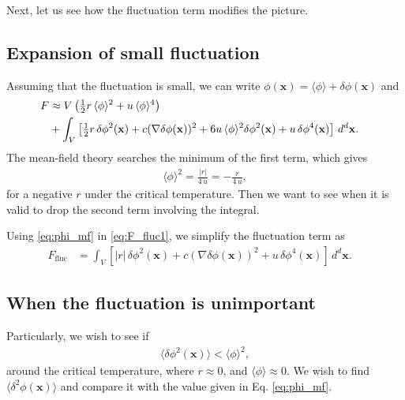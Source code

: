\documentclass{article}
\begin{document}
Next, let us see how the fluctuation term modifies the picture.



\subsection{Expansion of small fluctuation}



Assuming that the fluctuation is small, we can write
$\phi(\mathbf x) = \langle \phi \rangle + \delta \phi(\mathbf x)$
and
\begin{align}
F
&\approx
V \left(
\tfrac{1}{2} r \, \langle \phi \rangle^2 + u \, \langle \phi \rangle^4
\right)
\notag
\\
&+
\int_V \left[
\tfrac{1}{2} r \, \delta \phi^2(\mathbf x)
+ c (\nabla \delta \phi(\mathbf x))^2
+ 6 u \, \langle \phi \rangle^2 \delta \phi^2(\mathbf x)
+ u \, \delta \phi^4(\mathbf x)
\right] \, d^d \mathbf x. \quad
\label{eq:F_fluc1}
\end{align}
The mean-field theory searches the minimum of the first term, which gives
\begin{align}
  \langle \phi \rangle^2 = \frac{|r|}{4\,u} = - \frac{r}{4\,u},
\label{eq:phi_mf}
\end{align}
for a negative $r$ under the critical temperature.
Then we want to see when it is valid to drop the second term
involving the integral.


Using \eqref{eq:phi_mf} in \eqref{eq:F_fluc1},
we simplify the fluctuation term as
\begin{align}
F_\mathrm{fluc}
&=
\int_V \left[
|r| \, \delta \phi^2(\mathbf x)
+ c (\nabla \delta \phi(\mathbf x))^2
+ u \, \delta \phi^4(\mathbf x)
\right] \, d^d \mathbf x. \quad
\label{eq:F_fluc2}
\end{align}



\subsection{When the fluctuation is unimportant}


Particularly, we wish to see if
\begin{align}
\langle \delta\phi^2(\mathbf x) \rangle
< \langle \phi \rangle^2,
\label{eq:phicmp}
\end{align}
around the critical temperature, where $r \approx 0$, and $\langle \phi \rangle \approx 0$.
We wish to find $\langle \delta^2 \phi(\mathbf x) \rangle$
and compare it with the value given in Eq. \eqref{eq:phi_mf}.
\end{document}
